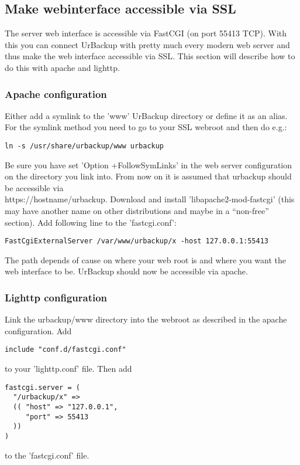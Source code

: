 \documentclass[a4paper,10pt]{article}
\begin{document}
\subsection{Make webinterface accessible via SSL}
\label{sec_webinterface_ssl}

The server web interface is accessible via FastCGI (on port 55413 TCP). With this you can connect UrBackup with pretty much every modern web server and thus make the web interface accessible via SSL. This section will describe how to do this with apache and lighttp.

\subsubsection{Apache configuration}
\label{subsub_apache}

Either add a symlink to the 'www' UrBackup directory or define it as an alias. For the symlink method you need to go to your SSL webroot and then do e.g.:
\begin{verbatim}
ln -s /usr/share/urbackup/www urbackup
\end{verbatim}
Be sure you have set 'Option +FollowSymLinks' in the web server configuration on the directory you link into. From now on it is assumed that urbackup should be accessible via\\ https://hostname/urbackup.
Download and install 'libapache2-mod-fastcgi' (this may have another name on other distributions and maybe in a ``non-free'' section). Add following line to the 'fastcgi.conf':
\begin{verbatim}
FastCgiExternalServer /var/www/urbackup/x -host 127.0.0.1:55413
\end{verbatim}
The path depends of cause on where your web root is and where you want the web interface to be. UrBackup should now be accessible via apache.

\subsubsection{Lighttp configuration}

Link the urbackup/www directory into the webroot as described in the apache configuration.
Add
\begin{verbatim}
include "conf.d/fastcgi.conf"
\end{verbatim}
to your 'lighttp.conf' file. Then add 
\begin{verbatim}
fastcgi.server = (
  "/urbackup/x" =>
  (( "host" => "127.0.0.1",
     "port" => 55413
  ))
)
\end{verbatim}
to the 'fastcgi.conf' file.
\end{document}
